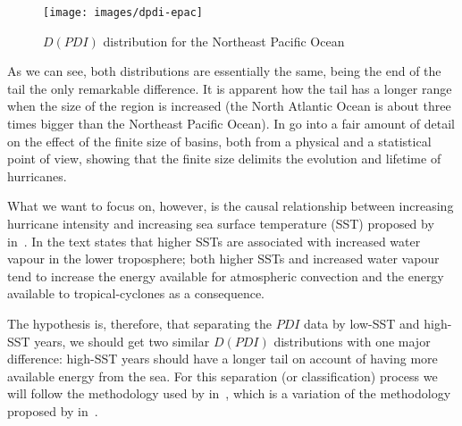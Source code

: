 \begin{figure}[H]
	\centering
	\texttt{[image: images/dpdi-epac]}
	\caption{$D(PDI)$ distribution for the Northeast Pacific Ocean}
	\label{fig:dpdi-epac}
\end{figure}

As we can see, both distributions are essentially the same, being the end of the tail the only remarkable difference. It is apparent how the tail has a longer range when the size of the region is increased (the North Atlantic Ocean is about three times bigger than the Northeast Pacific Ocean). In \cite{Corral2010} \citeauthor{Corral2010} go into a fair amount of detail on the effect of the finite size of basins, both from a physical and a statistical point of view, showing that the finite size delimits the evolution and lifetime of hurricanes.

\sk
What we want to focus on, however, is the causal relationship between increasing hurricane intensity and increasing sea surface temperature (SST) proposed by \citeauthor{Trenberth2005} in~\cite{Trenberth2005}. In the text \citeauthor{Trenberth2005} states that higher SSTs are associated with increased water vapour in the lower troposphere; both higher SSTs and increased water vapour tend to increase the energy available for atmospheric convection and the energy available to tropical-cyclones as a consequence.

The hypothesis is, therefore, that separating the $PDI$ data by low-SST and high-SST years, we should get two similar $D(PDI)$ distributions with one major difference: high-SST years should have a longer tail on account of having more available energy from the sea. For this separation (or classification) process we will follow the methodology used by \citeauthor{Corral2010} in~\cite{Corral2010}, which is a variation of the methodology proposed by \citeauthor{Webster2005} in~\cite{Webster2005}.
